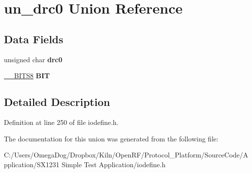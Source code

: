 \hypertarget{unionun__drc0}{\section{un\-\_\-drc0 Union Reference}
\label{unionun__drc0}
}
\subsection*{Data Fields}
\begin{DoxyCompactItemize}
\item 
\hypertarget{unionun__drc0_a7ca225b59fa5448bdf2df09d39b49457}{unsigned char {\bfseries drc0}}\label{unionun__drc0_a7ca225b59fa5448bdf2df09d39b49457}

\item 
\hypertarget{unionun__drc0_ab65c71ed06a927fda258981c0bfc6855}{\hyperlink{struct_____b_i_t_s8}{\-\_\-\-\_\-\-B\-I\-T\-S8} {\bfseries B\-I\-T}}\label{unionun__drc0_ab65c71ed06a927fda258981c0bfc6855}

\end{DoxyCompactItemize}


\subsection{Detailed Description}


Definition at line 250 of file iodefine.\-h.



The documentation for this union was generated from the following file\-:\begin{DoxyCompactItemize}
\item 
C\-:/\-Users/\-Omega\-Dog/\-Dropbox/\-Kiln/\-Open\-R\-F/\-Protocol\-\_\-\-Platform/\-Source\-Code/\-Application/\-S\-X1231 Simple Test Application/iodefine.\-h\end{DoxyCompactItemize}
